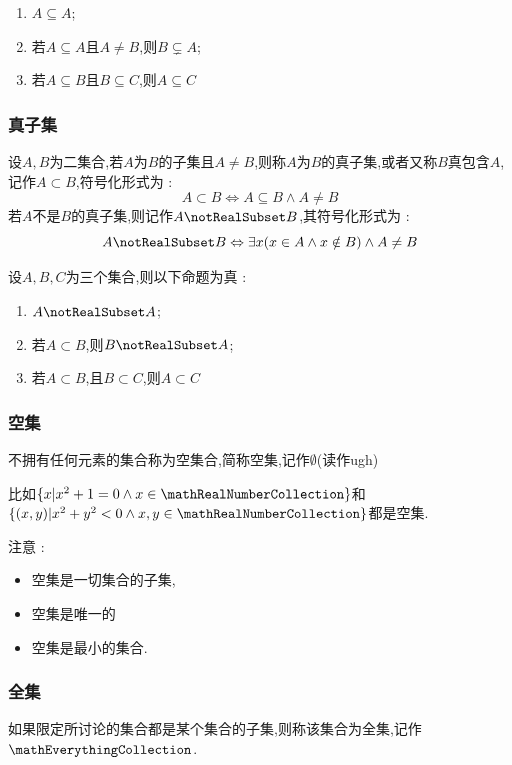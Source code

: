 {{{{  \begin{enumerate}
    \item $A \subseteq A$;
    \item 若$A \subseteq A$且$A \neq B$,则$B \subsetneq A$;
    \item 若$A \subseteq B$且$B \subseteq C$,则$A \subseteq C$
  \end{enumerate}
}%

\subsubsection{真子集}{
  设$A,B$为二集合,若$A$为$B$的子集且$A \neq B$,则称$A$为$B$的真子集,或者又称$B$真包含$A$,记作$A \subset B$,符号化形式为 : $$
    A \subset B \Leftrightarrow A \subseteq B \land A \neq B
  $$
  若$A$不是$B$的真子集,则记作$A \notRealSubset B$,其符号化形式为 : $$
    A \notRealSubset B \Leftrightarrow \exists x (x \in A \land x \notin B) \land A \neq B
  $$

  设$A,B,C$为三个集合,则以下命题为真 :

  \begin{enumerate}
    \item $A \notRealSubset A$;
    \item 若$A \subset B$,则$B \notRealSubset A$;
    \item 若$A \subset B$,且$B \subset C$,则$A \subset C$
  \end{enumerate}
}%

\subsubsection{空集}{
  不拥有任何元素的集合称为空集合,简称空集,记作$\emptyset$(读作ugh)

  比如$\{x | x^2 + 1 = 0 \land x \in \mathRealNumberCollection\}$和$\{(x,y) | x^2+y^2 < 0 \land x,y \in \mathRealNumberCollection\}$都是空集.

  注意 :

  \begin{itemize}
    \item 空集是一切集合的子集,
    \item 空集是唯一的
    \item 空集是最小的集合.
  \end{itemize}
}%

\subsubsection{全集}{
  如果限定所讨论的集合都是某个集合的子集,则称该集合为全集,记作$\mathEverythingCollection$.

}}}}

